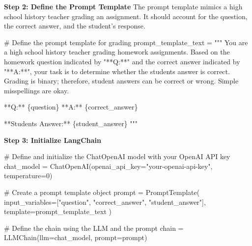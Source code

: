 \documentclass[
]{agujournal2019}
\newenvironment{Shaded}{\begin{snugshade}}{\end{snugshade}}
\newcommand{\CommentTok}[1]{\textcolor[rgb]{0.37,0.37,0.37}{#1}}
\newcommand{\DecValTok}[1]{\textcolor[rgb]{0.68,0.00,0.00}{#1}}
\newcommand{\NormalTok}[1]{\textcolor[rgb]{0.00,0.23,0.31}{#1}}
\newcommand{\OperatorTok}[1]{\textcolor[rgb]{0.37,0.37,0.37}{#1}}
\newcommand{\SpecialCharTok}[1]{\textcolor[rgb]{0.37,0.37,0.37}{#1}}
\newcommand{\StringTok}[1]{\textcolor[rgb]{0.13,0.47,0.30}{#1}}
\begin{document}
\textbf{Step 2: Define the Prompt Template} The prompt template mimics a
high school history teacher grading an assignment. It should account for
the question, the correct answer, and the student's response.

\begin{Shaded}
\begin{Highlighting}[]
\CommentTok{\# Define the prompt template for grading}
\NormalTok{prompt\_template\_text }\OperatorTok{=} \StringTok{"""}
\StringTok{You are a high school history teacher grading homework assignments. }
\StringTok{Based on the homework question indicated by "**Q:**" and the correct answer }
\StringTok{indicated by "**A:**", your task is to determine whether the student\textquotesingle{}s answer is correct. }
\StringTok{Grading is binary; therefore, student answers can be correct or wrong. }
\StringTok{Simple misspellings are okay.}

\StringTok{**Q:** }\SpecialCharTok{\{question\}}
\StringTok{**A:** }\SpecialCharTok{\{correct\_answer\}}

\StringTok{**Student\textquotesingle{}s Answer:** }\SpecialCharTok{\{student\_answer\}}
\StringTok{"""}
\end{Highlighting}
\end{Shaded}

\textbf{Step 3: Initialize LangChain}

\begin{Shaded}
\begin{Highlighting}[]
\CommentTok{\# Define and initialize the ChatOpenAI model with your OpenAI API key}
\NormalTok{chat\_model }\OperatorTok{=}\NormalTok{ ChatOpenAI(openai\_api\_key}\OperatorTok{=}\StringTok{"your{-}openai{-}api{-}key"}\NormalTok{, temperature}\OperatorTok{=}\DecValTok{0}\NormalTok{)}

\CommentTok{\# Create a prompt template object}
\NormalTok{prompt }\OperatorTok{=}\NormalTok{ PromptTemplate(}
\NormalTok{    input\_variables}\OperatorTok{=}\NormalTok{[}\StringTok{"question"}\NormalTok{, }\StringTok{"correct\_answer"}\NormalTok{, }\StringTok{"student\_answer"}\NormalTok{],}
\NormalTok{    template}\OperatorTok{=}\NormalTok{prompt\_template\_text}
\NormalTok{)}

\CommentTok{\# Define the chain using the LLM and the prompt}
\NormalTok{chain }\OperatorTok{=}\NormalTok{ LLMChain(llm}\OperatorTok{=}\NormalTok{chat\_model, prompt}\OperatorTok{=}\NormalTok{prompt)}
\end{Highlighting}
\end{Shaded}
\end{document}
